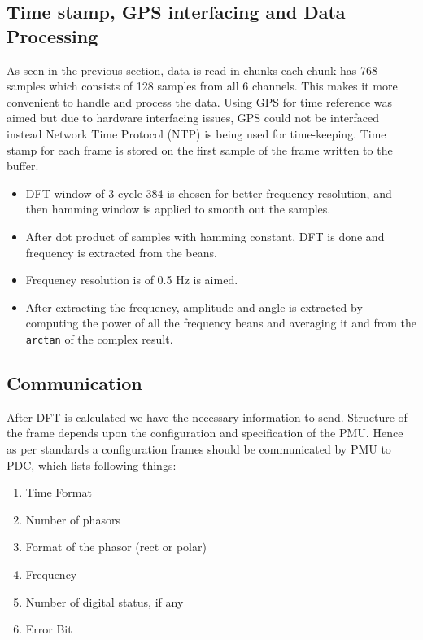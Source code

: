 \subsection{Time stamp, GPS interfacing and Data Processing }
As seen in the previous section, data is read in chunks each chunk has 768 samples which consists of 128 samples from all 6 channels. This makes it more convenient to handle and process the data. Using GPS for time reference was aimed but due to hardware interfacing issues, GPS could not be interfaced instead Network Time Protocol (NTP) is being used for time-keeping. Time stamp for each frame is stored on the first sample of the frame written to the buffer.

\begin{itemize}
	\item DFT window of 3 cycle 384 is chosen for better frequency resolution, and then hamming window is applied to smooth out the samples.
	\item After dot product of samples with hamming constant, DFT is done and frequency is extracted from the beans. 
	\item Frequency resolution is of 0.5 Hz is aimed.
	\item After extracting the frequency, amplitude and angle is extracted by computing the power of all the frequency beans and averaging it and from the \texttt{arctan} of the complex result.
\end{itemize} 

\subsection{Communication}

After DFT is calculated we have the necessary information to send. Structure of the frame depends upon the configuration and specification of the PMU. Hence as per standards a configuration frames should be communicated by PMU to PDC, which lists following things:
\begin{enumerate}
	\item Time Format 
	\item Number of phasors
	\item Format of the phasor (rect or polar)
	\item Frequency
	\item Number of digital status, if any
	\item Error Bit
\end{enumerate}

